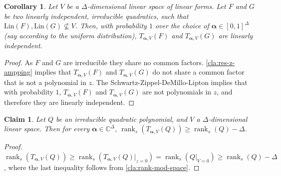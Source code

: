 \documentclass[10pt,a4paper]{article}
\newtheorem{claim}[theorem]{Claim}
\newtheorem{corollary}[theorem]{Corollary}
\def\rank{\operatorname{rank}}
\newcommand{\vecalpha}{\boldsymbol{\alpha}}
\newcommand{\vaa}{{\vecalpha}}
\renewcommand{\C}{\mathbb{C}}
\newcommand{\MS}{\text{Lin}}
\begin{document}
\begin{corollary}\label{cla:still-indep}
	Let $V$ be a $\Delta$-dimensional linear space of linear forms. Let $F$ and  $G$ be two linearly independent, irreducible quadratics, such that $\MS(F),\MS(G)\not\subseteq V$. Then, with probability $1$ over the choice of $\vaa \in [0,1]^{\Delta}$ (say according to the uniform distribution), $T_{\vaa, V}(F)$ and $T_{\vaa, V}(G)$ are linearly independent.
\end{corollary}

\begin{proof}
	As $F$ and $G$ are irreducible  they share no common factors. \autoref{cla:res-z-ampping} implies that  $T_{\vaa, V}(F)$ and $T_{\vaa, V}(G)$ do not share a common factor that is not a polynomial in $z$.  The Schwartz-Zippel-DeMillo-Lipton implies that with probability $1$,   $T_{\vaa, V}(F)$ and $T_{\vaa, V}(G)$ are not polynomials in $z$, and therefore they are linearly independent.
\end{proof}

\begin{claim}\label{cla:z-map-rank}
Let $Q$ be an irreducible quadratic polynomial, and $V$  a $\Delta$-dimensional linear space.
Then for every $\vaa \in \C^{\Delta}$,  $\rank_s(T_{\vaa, V}(Q)) \geq \rank_s(Q)-\Delta$.
\end{claim}
\begin{proof}
$\rank_s(T_{\vaa, V}(Q)) \geq \rank_s(T_{\vaa, V}(Q)|_{z=0}) = \rank_s(Q|_{V=0}) \geq \rank_s(Q)-\Delta$, where the last inequality follows from \autoref{cla:rank-mod-space}.
\end{proof}
\end{document}
